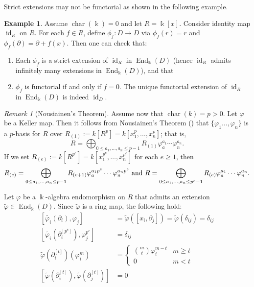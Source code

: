 \documentclass[11pt]{amsart}
\theoremstyle{definition}
\newtheorem{example}[theorem]{Example}
\theoremstyle{remark}
\newtheorem{remark}[theorem]{Remark}
\numberwithin{equation}{subsection}
\DeclareMathOperator{\id}{id}
\DeclareMathOperator{\kk}{\Bbbk}
\DeclareMathOperator{\ch}{char}
\DeclareMathOperator{\End}{End}
\begin{document}
Strict extensions may not be functorial as shown in the following example.
\begin{example}
\label{infinitely many ext of Keller}
Assume $\ch(\kk)=0$ and let $R=\kk[x]$. Consider identity map $\id_R$ on $R$. For each $f\in R$, define $\phi_f:D\to D$ via $\phi_f(r)=r$ and $\phi_f(\partial)=\partial+f(x)$. Then one can check that:
\begin{enumerate}
\item Each $\phi_f$ is a strict extension of $\id_R$ in $\End_{\kk}(D)$ (hence $\id_R$ admits infinitely many extensions in $\End_{\kk}(D)$), and that
\item $\phi_f$ is functorial if and only if $f=0$. The unique functorial extension of $\id_R$ in $\End_{\kk}(D)$ is indeed $\id_D$. 
\end{enumerate}
\end{example}


\begin{remark}[Nousiainen's Theorem]
Assume now that $\ch(k)=p>0$. Let $\varphi$ be a Keller map. Then it follows from Nousiainen's Theorem (\cite{NousiainenThesis}) that $\{\varphi_1\dots,\varphi_n\}$ is a $p$-basis for $R$ over $R_{(1)}:=k[R^p]=k[x^p_1,\dots,x^p_n]$; that is, 
\[R= \bigoplus_{0\leq a_1,\dots,a_n\leq p-1}R_{(1)}\varphi^{a_1}_a\cdots \varphi^{a_n}_n.\]
If we set $R_{(e)}:=k[R^{p^e}]=k[x^{p^e}_1,\dots,x^{p^e}_n]$ for each $e\geq 1$, then 
\[R_{(e)}= \bigoplus_{0\leq a_1,\dots,a_n\leq p-1}R_{(e+1)}\varphi^{a_1p^e}_a\cdots \varphi^{a_np^e}_n\ {\rm and}\ R= \bigoplus_{0\leq a_1,\dots,a_n\leq p^e-1}R_{(e)}\varphi^{a_1}_a\cdots \varphi^{a_n}_n.\]
\end{remark}



Let $\varphi$ be a $\kk$-algebra endomorphism on $R$ that admits an extension $\tilde{\varphi}\in \End_{\kk}(D)$. Since $\tilde{\varphi}$ is a ring map, the following hold:
\begin{equation}
\begin{aligned}
\label{action of d on phi}
[\tilde{\varphi_i}(\partial_i), \varphi_j] & =\tilde{\varphi}([x_i,\partial_j])=\tilde{\varphi}(\delta_{ij})=\delta_{ij} \\
[\tilde{\varphi_i}(\partial^{[p^e]}_i), \varphi^{p^e}_j] & =\delta_{ij} \\
\tilde{\varphi}(\partial^{[t]}_i)(\varphi^{m}_i) & =\begin{cases}\binom{m}{t}\varphi^{m-t}_i & m\geq t \\0 & m<t\end{cases}  \\
[\tilde{\varphi}(\partial^{[t]}_i), \tilde{\varphi}(\partial^{[t]}_j)] & =0 
\end{aligned}
\end{equation}
\end{document}
